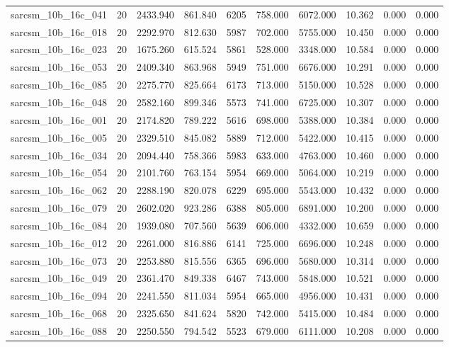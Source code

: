 \begin{tabular}{lrrrrrrrrr}
sarcsm\_10b\_16c\_041 & 20 & 2433.940 & 861.840 & 6205 & 758.000 & 6072.000 & 10.362 & 0.000 & 0.000 \\
sarcsm\_10b\_16c\_018 & 20 & 2292.970 & 812.630 & 5987 & 702.000 & 5755.000 & 10.450 & 0.000 & 0.000 \\
sarcsm\_10b\_16c\_023 & 20 & 1675.260 & 615.524 & 5861 & 528.000 & 3348.000 & 10.584 & 0.000 & 0.000 \\
sarcsm\_10b\_16c\_053 & 20 & 2409.340 & 863.968 & 5949 & 751.000 & 6676.000 & 10.291 & 0.000 & 0.000 \\
sarcsm\_10b\_16c\_085 & 20 & 2275.770 & 825.664 & 6173 & 713.000 & 5150.000 & 10.528 & 0.000 & 0.000 \\
sarcsm\_10b\_16c\_048 & 20 & 2582.160 & 899.346 & 5573 & 741.000 & 6725.000 & 10.307 & 0.000 & 0.000 \\
sarcsm\_10b\_16c\_001 & 20 & 2174.820 & 789.222 & 5616 & 698.000 & 5388.000 & 10.384 & 0.000 & 0.000 \\
sarcsm\_10b\_16c\_005 & 20 & 2329.510 & 845.082 & 5889 & 712.000 & 5422.000 & 10.415 & 0.000 & 0.000 \\
sarcsm\_10b\_16c\_034 & 20 & 2094.440 & 758.366 & 5983 & 633.000 & 4763.000 & 10.460 & 0.000 & 0.000 \\
sarcsm\_10b\_16c\_054 & 20 & 2101.760 & 763.154 & 5954 & 669.000 & 5064.000 & 10.219 & 0.000 & 0.000 \\
sarcsm\_10b\_16c\_062 & 20 & 2288.190 & 820.078 & 6229 & 695.000 & 5543.000 & 10.432 & 0.000 & 0.000 \\
sarcsm\_10b\_16c\_079 & 20 & 2602.020 & 923.286 & 6388 & 805.000 & 6891.000 & 10.200 & 0.000 & 0.000 \\
sarcsm\_10b\_16c\_084 & 20 & 1939.080 & 707.560 & 5639 & 606.000 & 4332.000 & 10.659 & 0.000 & 0.000 \\
sarcsm\_10b\_16c\_012 & 20 & 2261.000 & 816.886 & 6141 & 725.000 & 6696.000 & 10.248 & 0.000 & 0.000 \\
sarcsm\_10b\_16c\_073 & 20 & 2253.880 & 815.556 & 6365 & 696.000 & 5680.000 & 10.314 & 0.000 & 0.000 \\
sarcsm\_10b\_16c\_049 & 20 & 2361.470 & 849.338 & 6467 & 743.000 & 5848.000 & 10.521 & 0.000 & 0.000 \\
sarcsm\_10b\_16c\_094 & 20 & 2241.550 & 811.034 & 5954 & 665.000 & 4956.000 & 10.431 & 0.000 & 0.000 \\
sarcsm\_10b\_16c\_068 & 20 & 2325.650 & 841.624 & 5820 & 742.000 & 5415.000 & 10.484 & 0.000 & 0.000 \\
sarcsm\_10b\_16c\_088 & 20 & 2250.550 & 794.542 & 5523 & 679.000 & 6111.000 & 10.208 & 0.000 & 0.000 \\

\end{tabular}
